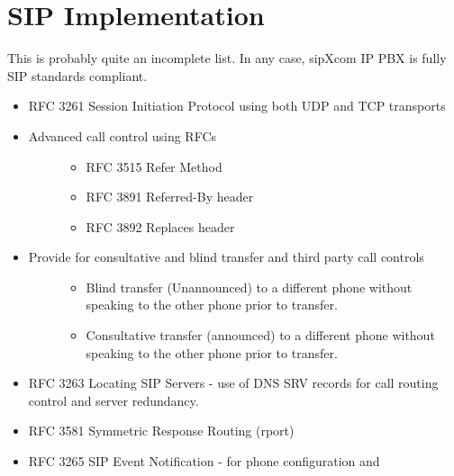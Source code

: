 \documentclass[letterpaper,10pt,english]{sphinxmanual}
\begin{document}
\section{SIP Implementation}
\label{\detokenize{features:sip-implementation}}
This is probably quite an incomplete list. In any case, sipXcom IP PBX is fully SIP standards compliant.
\begin{itemize}
\item {} 
RFC 3261 Session Initiation Protocol using both UDP and TCP transports

\item {} \begin{description}
\item[{Advanced call control using RFCs}] \leavevmode\begin{itemize}
\item {} 
RFC 3515 Refer Method

\item {} 
RFC 3891 Referred-By header

\item {} 
RFC 3892 Replaces header

\end{itemize}

\end{description}

\item {} \begin{description}
\item[{Provide for consultative and blind transfer and third party call controls}] \leavevmode\begin{itemize}
\item {} 
Blind transfer (Unannounced) to a different phone without speaking to the other phone prior to transfer.

\item {} 
Consultative transfer (announced) to a different phone without speaking to the other phone prior to transfer.

\end{itemize}

\end{description}

\item {} 
RFC 3263 Locating SIP Servers - use of DNS SRV records for call routing control and server redundancy.

\item {} 
RFC 3581 Symmetric Response Routing (rport)

\item {} 
RFC 3265 SIP Event Notification - for phone configuration and


\end{itemize}
\end{document}
